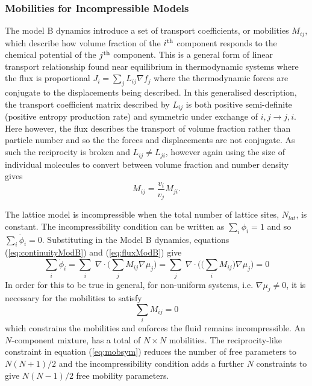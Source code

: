 \subsubsection{Mobilities for Incompressible Models}
The model B dynamics introduce a set of transport coefficients, or mobilities $M_{ij}$, which describe how volume fraction of the $i\textsuperscript{th}$ component responds to the chemical potential of the $j\textsuperscript{th}$ component. This is a general form of linear transport relationship found near equilibrium in thermodynamic systems where the flux is proportional $J_i = \sum_{j}L_{ij}\nabla f_{j}$ where the thermodynamic forces are conjugate to the displacements being described. In this generalised description, the transport coefficient matrix described by $L_{ij}$ is both positive semi-definite (positive entropy production rate) and symmetric under exchange of $i, j \rightarrow j, i$. Here however, the flux describes the transport of volume fraction rather than particle number and so the the forces and displacements are not conjugate. As such the reciprocity is broken and $L_{ij} \neq L_{ji}$, however again using the size of individual molecules to convert between volume fraction and number density gives
\begin{equation}
    {M}_{ij} = \frac{v_i}{v_j}{M}_{ji}.
    \label{eq:mobsym}
\end{equation}

The lattice model is incompressible when the total number of lattice sites, $N_{lat}$, is constant. The incompressibility condition can be written as $\sum_i\phi_i = 1$ and so $\sum_i\dot{\phi}_i = 0$. Substituting in the Model B dynamics, equations (\ref{eq:continuityModB}) and (\ref{eq:fluxModB}) give
\begin{equation}
    \sum_i\dot{\phi}_i = \sum_i\;\nabla\cdot\bigg(\sum_j M_{ij}\nabla\mu_j\bigg) = \sum_j\;\nabla\cdot\bigg(\big(\sum_i M_{ij}\big)\nabla\mu_j\bigg) = 0
\end{equation}
In order for this to be true in general, for non-uniform systems, i.e. $\nabla\mu_j \neq 0$, it is necessary for the mobilities to satisfy
\begin{equation}
    \sum_i M_{ij} = 0
    \label{eq:mobinc}
\end{equation}
which constrains the mobilities and enforces the fluid remains incompressible. An $N$-component mixture,  has a total of $N\times N$ mobilities. The reciprocity-like constraint in equation (\ref{eq:mobsym}) reduces the number of free parameters to $N(N+1)/2$ and the incompressibility condition adds a further $N$ constraints to give $N(N-1)/2$ free mobility parameters.

